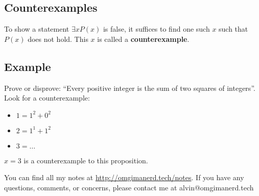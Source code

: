 \documentclass[letterpaper, 12pt]{math}
\begin{document}
\subsection*{Counterexamples}
To show a statement \( \exists{x}P(x) \) is false, it suffices to find one such
\( x \) such that \( P(x) \) does not hold. This \( x \) is called a
\textbf{counterexample}.

\subsection*{Example}
Prove or disprove: ``Every positive integer is the sum of two squares of
integers''. Look for a counterexample:
\begin{itemize}
  \item \( 1 = 1^{2}+0^{2} \)
  \item \( 2 = 1^{1}+1^{2} \)
  \item \( 3 = \dots \)
\end{itemize}
\( x = 3 \) is a counterexample to this proposition.

\begin{center}
  You can find all my notes at \url{http://omgimanerd.tech/notes}. If you have
  any questions, comments, or concerns, please contact me at
  alvin@omgimanerd.tech
\end{center}
\end{document}
